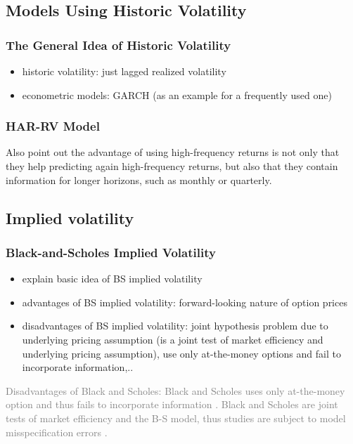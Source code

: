 \subsection{Models Using Historic Volatility}
\subsubsection{The General Idea of Historic Volatility}
\begin{itemize}\itemsep0pt
\item historic volatility: just lagged realized volatility
\item econometric models: GARCH (as an example for a frequently used one)
\end{itemize}	

\subsubsection{HAR-RV Model}

Also \citeauthor{andersen2003} point out the advantage of using high-frequency returns is not only that they help predicting again high-frequency returns, but also that they contain information for longer horizons, such as monthly or quarterly. 


\subsection{Implied volatility}
\subsubsection{Black-and-Scholes Implied Volatility}
\begin{itemize}\itemsep0pt
\item explain basic idea of BS implied volatility
\item advantages of BS implied volatility: forward-looking nature of option prices
\item disadvantages of BS implied volatility: joint hypothesis problem due to underlying  pricing assumption (is a joint test of market efficiency and underlying pricing assumption), use only at-the-money options and fail to incorporate information,..
\end{itemize}

\textcolor{gray}{
Disadvantages of Black and Scholes: Black and Scholes uses only at-the-money option and thus fails to incorporate information \parencite{jiang2003}.
Black and Scholes are joint tests of market efficiency and the B-S model, thus studies are subject to model misspecification errors \parencite{jiang2003}.}

